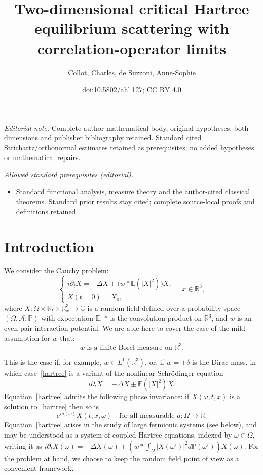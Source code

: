 \documentclass[10pt]{amsart}
\title{Two-dimensional critical Hartree equilibrium scattering with correlation-operator limits}
\author{Collot, Charles, de Suzzoni, Anne-Sophie}
\date{doi:10.5802/ahl.127; CC BY 4.0}
\theoremstyle{definition}\newtheorem{defi}[theo]{Definition}\newtheorem{rema}[theo]{Remark}\newtheorem{exam}[theo]{Example}\newtheorem{exem}[theo]{Example}\newtheorem{nota}[theo]{Notation}
\newcommand{\R}{\mathbb{R}}
\newcommand{\C}{\mathbb{C}}
\newcommand{\E}{\mathbb{E}}
\newcommand{\bbP}{\mathbb{P}}
\newcommand{\mclA}{\mathcal{A}}
\newcommand{\pa}{\partial}
\begin{document}
\maketitle
\noindent\textit{Editorial note.} Complete author mathematical body, original hypotheses, both dimensions and publisher bibliography retained. Standard cited Strichartz/orthonormal estimates retained as prerequisites; no added hypotheses or mathematical repairs.\par\medskip
\noindent\textit{Allowed standard prerequisites (editorial).}\begin{itemize}
\item Standard functional analysis, measure theory and the author-cited classical theorems. Standard prior results stay cited; complete source-local proofs and definitions retained.
\end{itemize}\medskip
\tableofcontents



\section{Introduction}


We consider the Cauchy problem:
\begin{equation} \label{hartree}
\begin{cases}
i\partial_t X = -\Delta X + \big(w*\E\left(|X|^2\right)\big) X, \\
X(t=0) = X_0,
\end{cases} \quad x\in \R^3,
\end{equation}
where $X : \Omega \times \R_t \times \R^3_x\rightarrow \C$ is a random field defined over a probability space $(\Omega,\mclA, \bbP)$ with expectation $\E$, $*$ is the convolution product on $\R^3$, and $w$ is an even pair interaction potential. We are able here to cover the case of the mild assumption for $w$ that:
\begin{equation} \label{id:hpw}
w \text{ is a finite Borel measure on } \R^3.
\end{equation} 

This is the case if, for example, $w\in L^1(\R^3)$, or, if $w=\pm \delta$ is the Dirac mass, in which case~\eqref{hartree} is a variant of the nonlinear Schr\"odinger equation
\[
i\partial_t X = -\Delta X \pm \E\left(|X|^2\right) X.
\]
Equation~\eqref{hartree} admits the following phase invariance: if $X(\omega,t,x)$ is a solution to~\eqref{hartree} then so is
\begin{equation} \label{id:phase}
e^{ia(\omega)}X(t,x,\omega) \quad \text{for all measurable } a:\Omega \rightarrow \R.
\end{equation}
Equation~\eqref{hartree} arises in the study of large fermionic systems (see below), and may be understood as a system of coupled Hartree equations, indexed by $\omega \in \Omega$, writing it as $i\pa_t X(\omega)=-\Delta X(\omega)+(w*\int_{\Omega}|X(\omega')|^2d\bbP (\omega'))X(\omega)$. For the problem at hand, we choose to keep the random field point of view as a convenient framework.
\end{document}
